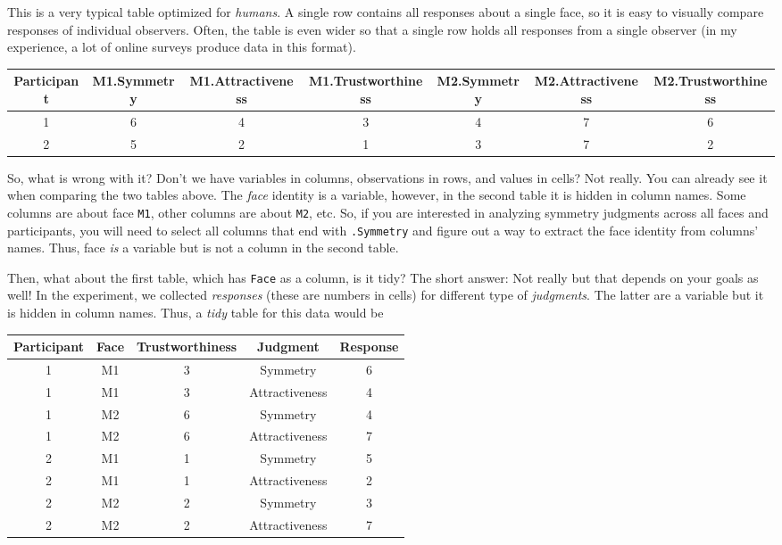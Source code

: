 \documentclass[
]{book}
\begin{document}
This is a very typical table optimized for \emph{humans}. A single row contains all responses about a single face, so it is easy to visually compare responses of individual observers. Often, the table is even wider so that a single row holds all responses from a single observer (in my experience, a lot of online surveys produce data in this format).

\begin{tabular}{c|c|c|c|c|c|c}
\hline
Participant & M1.Symmetry & M1.Attractiveness & M1.Trustworthiness & M2.Symmetry & M2.Attractiveness & M2.Trustworthiness\\
\hline
1 & 6 & 4 & 3 & 4 & 7 & 6\\
\hline
2 & 5 & 2 & 1 & 3 & 7 & 2\\
\hline
\end{tabular}

So, what is wrong with it? Don't we have variables in columns, observations in rows, and values in cells? Not really. You can already see it when comparing the two tables above. The \emph{face} identity is a variable, however, in the second table it is hidden in column names. Some columns are about face \texttt{M1}, other columns are about \texttt{M2}, etc. So, if you are interested in analyzing symmetry judgments across all faces and participants, you will need to select all columns that end with \texttt{.Symmetry} and figure out a way to extract the face identity from columns' names. Thus, face \emph{is} a variable but is not a column in the second table.

Then, what about the first table, which has \texttt{Face} as a column, is it tidy? The short answer: Not really but that depends on your goals as well! In the experiment, we collected \emph{responses} (these are numbers in cells) for different type of \emph{judgments}. The latter are a variable but it is hidden in column names. Thus, a \emph{tidy} table for this data would be

\begin{tabular}{c|c|c|c|c}
\hline
Participant & Face & Trustworthiness & Judgment & Response\\
\hline
1 & M1 & 3 & Symmetry & 6\\
\hline
1 & M1 & 3 & Attractiveness & 4\\
\hline
1 & M2 & 6 & Symmetry & 4\\
\hline
1 & M2 & 6 & Attractiveness & 7\\
\hline
2 & M1 & 1 & Symmetry & 5\\
\hline
2 & M1 & 1 & Attractiveness & 2\\
\hline
2 & M2 & 2 & Symmetry & 3\\
\hline
2 & M2 & 2 & Attractiveness & 7\\
\hline
\end{tabular}
\end{document}
